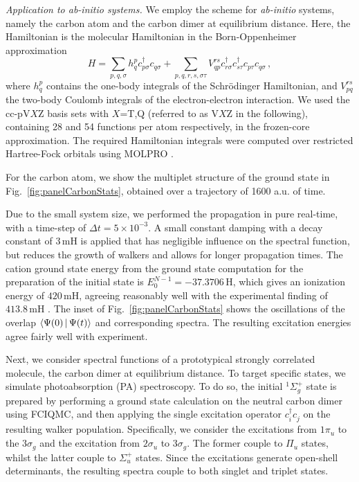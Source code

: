 \documentclass[aps,prl,twocolumn,showpacs,superscriptaddress,floatfix]{revtex4-1}
\def \Schrodinger {{Schr\"{o}dinger }}
\begin{document}
{\it Application to {\it ab-initio} systems.}
We employ the scheme for {\it ab-initio} systems, namely the carbon atom and the carbon dimer at equilibrium distance. Here, the Hamiltonian is the
molecular Hamiltonian in the Born-Oppenheimer approximation
\begin{equation}
H = \sum_{p,q,\sigma} h^p_{q} c_{p\sigma}^\dagger c^{}_{q\sigma} + \sum_{p,q,r,s,\sigma\tau} V^{rs}_{qp}
c^\dagger_{r\sigma} c^\dagger_{s\tau} c^{}_{p\tau} c^{}_{q\sigma}\,,
\end{equation}
where $h^p_q$ contains the one-body integrals of the \Schrodinger Hamiltonian, and
$V^{rs}_{pq}$ the two-body Coulomb integrals of the
electron-electron interaction. We used the cc-pV$X$Z basis sets with $X$=T,Q (referred to as V$X$Z in the following), 
containing 28 and 54 functions per atom respectively, in the frozen-core approximation. The required Hamiltonian integrals 
were computed over restricted Hartree-Fock orbitals using MOLPRO \cite{MOLPRO-WIREs}. 

For the carbon atom, we show the multiplet structure of the ground state in
Fig.~\ref{fig:panelCarbonStats}, obtained over a trajectory of 1600 a.u. of
time.  

Due to the small system size, we performed the
propagation in pure real-time, with a time-step of $\Delta t = 5\times 10^{-3}$. A small constant
damping with a decay constant of
$3\,\mathrm{mH}$ is applied that has negligible influence on the spectral function, but
reduces the growth of walkers and allows for longer propagation times.
The cation ground state
energy from the ground state computation for the preparation of the initial
state is $E^{N-1}_0=-37.3706\,\mathrm{H}$, which gives an ionization energy of
$420\,\mathrm{mH}$, agreeing reasonably well with the experimental finding of
$413.8\,\mathrm{mH}$ \cite{KW1966}. The inset of Fig.~\ref{fig:panelCarbonStats} shows the
oscillations of the overlap $\Braket{\Psi(0)|\Psi(t)}$ and corresponding
spectra. The resulting excitation energies agree fairly well with experiment.

Next, we consider spectral functions of a prototypical strongly correlated molecule, the carbon dimer  
at equilibrium distance.
To target specific states, we simulate photoabsorption (PA) spectroscopy. 
To do so, the initial $^1\Sigma_g^+$ state is prepared by performing a ground state calculation 
on the neutral carbon dimer using FCIQMC, and then applying the single excitation
operator $c^\dagger_ic^{}_j$ on the resulting walker population. Specifically,
we consider the excitations from $1\pi_u$ to the $3\sigma_g$ and the
excitation from $2\sigma_u$ to $3\sigma_g$. The former couple to $\Pi_u$ states, whilst the latter 
couple to $\Sigma^+_u$ states. Since the excitations generate open-shell determinants, the resulting 
spectra couple to both singlet and triplet states.                                                    
\end{document}
